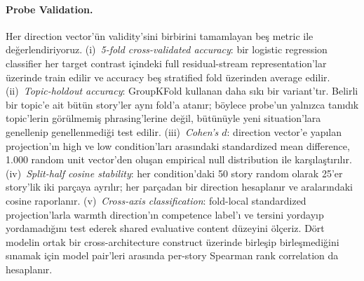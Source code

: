 \documentclass[twocolumn]{article}
\begin{document}
\paragraph{Probe Validation.}
Her direction vector'ün validity'sini birbirini tamamlayan beş metric ile
değerlendiriyoruz. (i)~\textit{5-fold cross-validated accuracy}: bir logistic
regression classifier her target contrast içindeki full residual-stream
representation'lar üzerinde train edilir ve accuracy beş stratified fold
üzerinden average edilir. (ii)~\textit{Topic-holdout accuracy}: GroupKFold
kullanan daha sıkı bir variant'tır. Belirli bir topic'e ait bütün story'ler aynı
fold'a atanır; böylece probe'un yalnızca tanıdık topic'lerin görülmemiş
phrasing'lerine değil, bütünüyle yeni situation'lara genellenip genellenmediği
test edilir. (iii)~\textit{Cohen's $d$}: direction vector'e yapılan projection'ın
high ve low condition'ları arasındaki standardized mean difference, 1.000 random
unit vector'den oluşan empirical null distribution ile karşılaştırılır.
(iv)~\textit{Split-half cosine stability}: her condition'daki 50 story random
olarak 25'er story'lik iki parçaya ayrılır; her parçadan bir direction hesaplanır
ve aralarındaki cosine raporlanır. (v)~\textit{Cross-axis classification}:
fold-local standardized projection'larla warmth direction'ın competence label'ı
ve tersini yordayıp yordamadığını test ederek shared evaluative content düzeyini
ölçeriz. Dört modelin ortak bir cross-architecture construct üzerinde birleşip
birleşmediğini sınamak için model pair'leri arasında per-story Spearman rank
correlation da hesaplanır.
\end{document}
